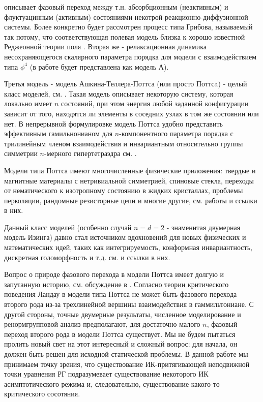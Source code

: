 \documentclass []{rusthesis} %
\begin{document}
описывает фазовый переход между т.н. абсорбционным (неактивным) и флуктуацинным (активным) состояниями некотрой реакционно-диффузионной системы. Более конкретно будет рассмотрен процесс типа Грибова, называемый так потому, что соответствующая полевая модель близка к хорошо известной Реджеонной теории поля \cite{Zinn}. Вторая же - релаксационная динамика несохраняющегося скалярного параметра порядка для модели с взаимодействием типа $\phi^4$ (в работе будет представлена как модель А).

Третья модель - модель Ашкина-Теллера-Поттса (или просто Поттсa) - целый класс моделей, см. \cite{Ashkin, Baxter, Golner, Zia, Priest, Amit, Alcantara}. Такая модель описывает некоторую систему, которая локально имеет $n$ состояний, при этом энергия любой заданной конфигурации зависит от того, находятся ли элементы в соседних узлах в том же состоянии или нет. В непрерывной формулировке модель Поттса удобно представить эффективным гамильнонианом для $n$-компонентного параметра порядка с трилинейным членом взаимодействия и инвариантным относительно группы симметрии $n$-мерного гипертетраэдра см. \cite{Golner, Zia, Priest, Amit, Alcantara}.

Модели типа Поттса имеют многочисленные физические приложения: твердые и магнитные материалы с нетривиальной симметрией, спиновые стекла, переходы от нематического к изотропному состоянию в жидких кристаллах, проблемы перколяции, рандомные резисторные цепи и многие другие, см. работы \cite{Golner, Zia, Priest, Amit, Alcantara} и ссылки в них. 

Данный класс моделей (особенно случай $n=d=2$ - знаменитая двумерная модель Изинга) давно стал источником вдохновений для новых физических и математических идей, таких как интегрируемость, конформная инвариантность, дискретная голоморфность и т.д. см. \cite{Cardy, IMConform}  и ссылки в них.

Вопрос о природе фазового перехода в модели Поттса имеет долгую и запутанную историю, см. обсуждение в \cite{Amit}. Согласно теории критического поведения Ландау в модели типа Поттса не может быть фазового перехода второго рода из-за трехлинейной вершины взаимодействия в гаммильтониане. С другой стороны, точные двумерные результаты, численное моделирование и ренормгрупповой анализ предполагают, для достаточно малого $n$, фазовый переход второго рода в модели Поттса существует. Мы не будем пытаться пролить новый свет на этот интересный и сложный вопрос: для начала, он должен быть решен для исходной статической проблемы. В данной работе мы принимаем точку зрения, что существование ИК-притягивающей неподвижной точки уравнения РГ подразумевает существование некоторого ИК асимптотического режима и, следовательно, существование какого-то критического сосотяния.
\end{document}
